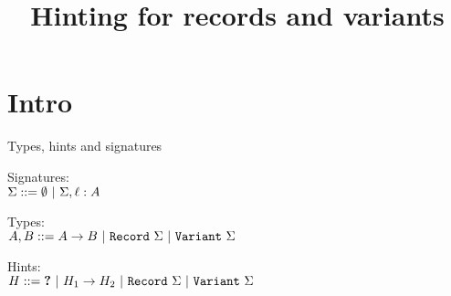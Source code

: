 \documentclass{beamer}
\title{Hinting for records and variants}
\date{}
\begin{document}
\frame{\titlepage}

\section{Intro}

\newcommand{\emptysig}{\emptyset}
\newcommand{\extendsig}[3]{#1, #2 : #3}
\newcommand{\funsig}[2]{#1 \to #2}

\newcommand{\sigok}[1]{#1\ \texttt{ok}}

\newcommand{\Record}[1]{\texttt{Record}\ #1}
\newcommand{\Variant}[1]{\texttt{Variant}\ #1}

\begin{frame}{Types, hints and signatures}

Signatures: \\
$\Sigma ::= \emptysig \pipe \extendsig{\Sigma}{\ell}{A}$

\vspace{2em}

Types: \\
$A, B ::= \Fun{A}{B} \pipe \Record{\Sigma} \pipe \Variant{\Sigma}$

\vspace{2em}

Hints: \\
$H ::= \Hole \pipe \Fun{H_1}{H_2} \pipe \Record{\Sigma} \pipe \Variant{\Sigma}$

\end{frame}

\newcommand{\emptyrecord}{\{\}}
\newcommand{\extendrecord}[3]{\{#1, #2 := #3\}}
\newcommand{\proj}[2]{#1.#2}

\newcommand{\cons}[2]{#1\ #2}
\newcommand{\vcase}[2]{\texttt{vcase}\ #1\ \texttt{of}\ #2}

\newcommand{\recordtype}[1]{\{#1\}}
\newcommand{\record}[1]{\{#1\}}

\newcommand{\recordtypes}[4]{\recordtype{#1_{#3} : #2_{#3}}_{#3 \in #4}}
\newcommand{\records}[4]{\record{#1_{#3} := #2_{#3}}_{#3 \in #4}}

\newcommand{\varianttype}[1]{\left[#1\right]}
\newcommand{\varianttypes}[4]{\varianttype{#1_{#3} : #2_{#3}}_{#3 \in #4}}
\end{document}
